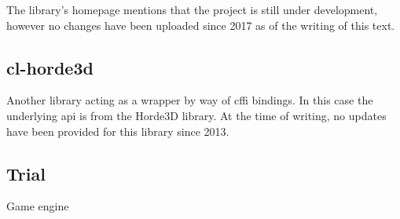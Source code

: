 The library's homepage mentions that the project is still under development,
however no changes have been uploaded since 2017 as of the writing of this text.

\subsection{cl-horde3d}

Another library acting as a wrapper by way of \ac{cffi} bindings.
In this case the underlying \ac{api} is from the Horde3D library\cite{horde3d}.
At the time of writing,
no updates have been provided for this library since 2013.

\subsection{Trial}

Game engine

